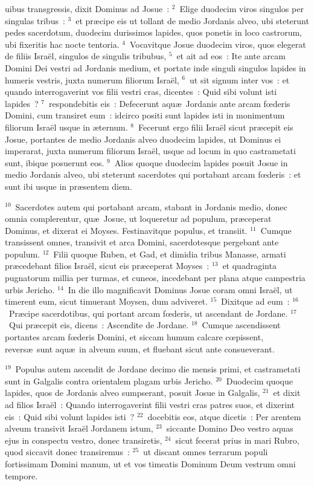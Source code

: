 \bchapter
{}uibus transgressis, dixit Dominus ad Josue~:
${}^{2}$~Elige duodecim viros singulos per singulas tribus~:
${}^{3}$~et pr\ae cipe eis ut tollant de medio Jordanis alveo, ubi steterunt pedes sacerdotum, duodecim durissimos lapides, quos ponetis in loco castrorum, ubi fixeritis hac nocte tentoria.
${}^{4}$~Vocavitque Josue duodecim viros, quos elegerat de filiis Isra\"el, singulos de singulis tribubus,
${}^{5}$~et ait ad eos~: Ite ante arcam Domini Dei vestri ad Jordanis medium, et portate inde singuli singulos lapides in humeris vestris, juxta numerum filiorum Isra\"el,
${}^{6}$~ut sit signum inter vos~: et quando interrogaverint vos filii vestri cras, dicentes~: Quid sibi volunt isti lapides~?
${}^{7}$~respondebitis eis~: Defecerunt aqu\ae\ Jordanis ante arcam fœderis Domini, cum transiret eum~: idcirco positi sunt lapides isti in monimentum filiorum Isra\"el usque in \ae ternum.
${}^{8}$~Fecerunt ergo filii Isra\"el sicut pr\ae cepit eis Josue, portantes de medio Jordanis alveo duodecim lapides, ut Dominus ei imperarat, juxta numerum filiorum Isra\"el, usque ad locum in quo castrametati sunt, ibique posuerunt eos.
${}^{9}$~Alios quoque duodecim lapides posuit Josue in medio Jordanis alveo, ubi steterunt sacerdotes qui portabant arcam fœderis~: et sunt ibi usque in pr\ae sentem diem.


${}^{10}$~Sacerdotes autem qui portabant arcam, stabant in Jordanis medio, donec omnia complerentur, qu\ae\ Josue, ut loqueretur ad populum, pr\ae ceperat Dominus, et dixerat ei Moyses. Festinavitque populus, et transiit.
${}^{11}$~Cumque transissent omnes, transivit et arca Domini, sacerdotesque pergebant ante populum.
${}^{12}$~Filii quoque Ruben, et Gad, et dimidia tribus Manasse, armati pr\ae cedebant filios Isra\"el, sicut eis pr\ae ceperat Moyses~:
${}^{13}$~et quadraginta pugnatorum millia per turmas, et cuneos, incedebant per plana atque campestria urbis Jericho.
${}^{14}$~In die illo magnificavit Dominus Josue coram omni Isra\"el, ut timerent eum, sicut timuerant Moysen, dum adviveret.
${}^{15}$~Dixitque ad eum~:
${}^{16}$~Pr\ae cipe sacerdotibus, qui portant arcam fœderis, ut ascendant de Jordane.
${}^{17}$~Qui pr\ae cepit eis, dicens~: Ascendite de Jordane.
${}^{18}$~Cumque ascendissent portantes arcam fœderis Domini, et siccam humum calcare cœpissent, revers\ae\ sunt aqu\ae\ in alveum suum, et fluebant sicut ante consueverant.


${}^{19}$~Populus autem ascendit de Jordane decimo die mensis primi, et castrametati sunt in Galgalis contra orientalem plagam urbis Jericho.
${}^{20}$~Duodecim quoque lapides, quos de Jordanis alveo sumpserant, posuit Josue in Galgalis,
${}^{21}$~et dixit ad filios Isra\"el~: Quando interrogaverint filii vestri cras patres suos, et dixerint eis~: Quid sibi volunt lapides isti~?
${}^{22}$~docebitis eos, atque dicetis~: Per arentem alveum transivit Isra\"el Jordanem istum,
${}^{23}$~siccante Domino Deo vestro aquas ejus in conspectu vestro, donec transiretis,
${}^{24}$~sicut fecerat prius in mari Rubro, quod siccavit donec transiremus~:
${}^{25}$~ut discant omnes terrarum populi fortissimam Domini manum, ut et vos timeatis Dominum Deum vestrum omni tempore.

